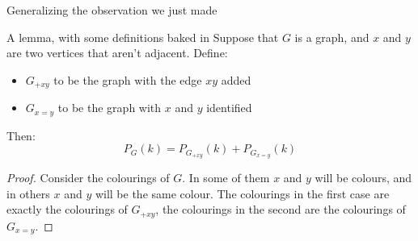 \documentclass{beamer}
\begin{document}
\begin{frame}{Generalizing the observation we just made}
  
  \begin{block}{A lemma, with some definitions baked in}
    Suppose that $G$ is a graph, and $x$ and $y$ are two vertices that aren't adjacent. Define:
    \begin{itemize}
    \item  $G_{+xy}$ to be the graph with the edge $xy$ added
    \item $G_{x=y}$ to be the graph with $x$ and $y$ identified
    \end{itemize}
    Then:
    $$P_G(k)=P_{G_{+xy}}(k)+P_{G_{x=y}}(k)$$
  \end{block}

  \begin{proof} Consider the colourings of $G$. In some of them $x$ and $y$ will be colours, and in others $x$ and $y$ will be the same colour.  The colourings in the first case are exactly the colourings of $G_{+xy}$, the colourings in the second are the colourings of $G_{x=y}$.
   \end{proof}
    
    \end{frame}
\end{document}
